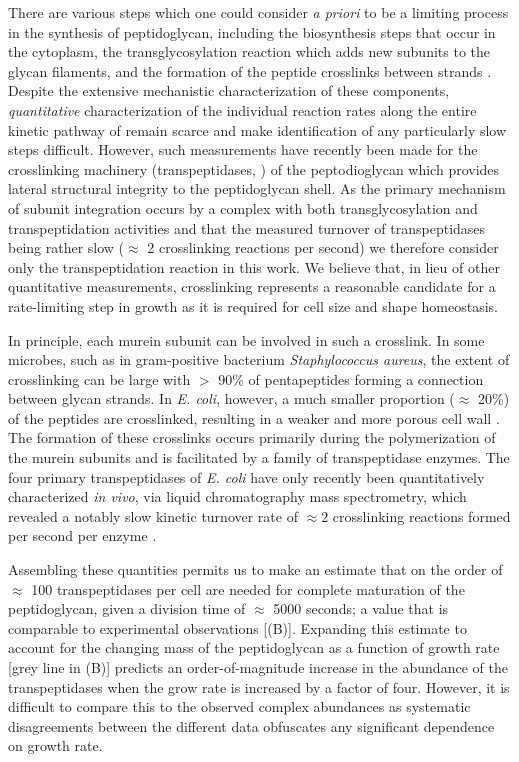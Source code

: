 There are various steps which one could consider \textit{a priori} to be a
limiting process in the synthesis of peptidoglycan, including the
biosynthesis steps that occur in the cytoplasm, the transglycosylation
reaction which adds new subunits to the glycan filaments, and the formation
of the peptide crosslinks between strands
\cite{shi2018,morgenstein2015,lovering2012,barreteau2008}. Despite the
extensive mechanistic characterization of these components,
\textit{quantitative} characterization of the individual reaction rates along
the entire kinetic pathway of remain scarce and make identification of any
particularly slow steps difficult. However, such measurements have recently
been made for the crosslinking machinery (transpeptidases,
\cite{catherwood2020}) of the peptodioglycan which provides lateral
structural integrity to the peptidoglycan shell. As the primary mechanism of
subunit integration occurs by a complex with both transglycosylation and
transpeptidation activities \cite{shi2018} and that the measured turnover of
transpeptidases being rather slow ($\approx$ 2 crosslinking reactions per
second) we therefore consider only the transpeptidation reaction in this
work. We believe that, in lieu of other quantitative measurements,
crosslinking represents a reasonable candidate for a rate-limiting step in
growth as it is required for cell size and shape homeostasis.

In principle, each murein subunit can be involved in such a crosslink. In
some microbes, such as in gram-positive bacterium \textit{Staphylococcus
aureus}, the extent of crosslinking can be large with $>$ 90\% of
pentapeptides forming a connection between glycan strands. In \textit{E.
coli}, however, a much smaller proportion ($\approx$ 20\%) of the peptides
are crosslinked, resulting in a weaker and more porous cell wall
\citep{vollmer2008a, rogers1980}. The formation of these crosslinks occurs
primarily during the polymerization of the murein subunits and is facilitated
by a family of transpeptidase enzymes. The four primary transpeptidases of
\textit{E. coli} have only recently been quantitatively characterized
\textit{in vivo}, via liquid chromatography mass spectrometry, which revealed
a notably slow kinetic turnover rate of $\approx 2$ crosslinking reactions
formed per second per enzyme \citep{catherwood2020}.

Assembling these quantities permits us to make an estimate that on the order
of $\approx$ 100 transpeptidases per cell are needed for complete maturation
of the peptidoglycan, given a division time of $\approx$ 5000 seconds; a
value that is comparable to experimental observations
[(B)]. Expanding this estimate to account for the changing
mass of the peptidoglycan as a function of growth rate [grey line in
(B)] predicts an order-of-magnitude increase in the
abundance of the transpeptidases when the grow rate is increased by a factor
of four. However, it is difficult to compare this to the observed complex
abundances as systematic disagreements between the different data obfuscates
any significant dependence on growth rate.


